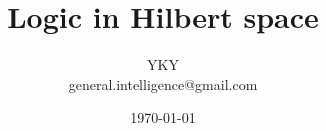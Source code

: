 


\usepackage{color}
\usepackage{mathtools}
\usepackage{hyperref}

\usepackage[backend=biber,style=authoryear]{biblatex}


\usepackage{graphicx} %
\usepackage{tikz-cd}
\usepackage{tikz}
\usepackage[export]{adjustbox}%
\usepackage{verbatim} %


\newcommand{\underdash}[1]{%
	\tikz[baseline=(toUnderline.base)]{
		\node[inner sep=1pt,outer sep=10pt] (toUnderline) {#1};
		\draw[dashed] ([yshift=-0pt]toUnderline.south west) -- ([yshift=-0pt]toUnderline.south east);
	}%
}%


\newcommand{\highlight}[1]{\colorbox{pink}{$\displaystyle #1$}}

\newcommand{\emp}[1]{{\color{violet}\textbf{#1}}}
\newcommand*\confoundFace{$\vcenter{\hbox{\texttt{[image: ../confounded-face.jpg]}}}$}

\newcommand*{\Cdot}{\raisebox{-0.5ex}{\scalebox{2}{$\cdot$}}}
\newcommand{\witness}{\scalebox{0.6}{$\blacksquare$}}
\providecommand\Heytingarrow{\relbar\joinrel\mathrel{\vcenter{\hbox{\scalebox{0.75}{$\rhd$}}}}}



\title{\cc{\bfseries\color{blue}{\Huge Logic in Hilbert space}}
{{\Huge Logic in Hilbert space}}}
\author{YKY \\{\small general.intelligence@gmail.com}} %
\date{\today} %

